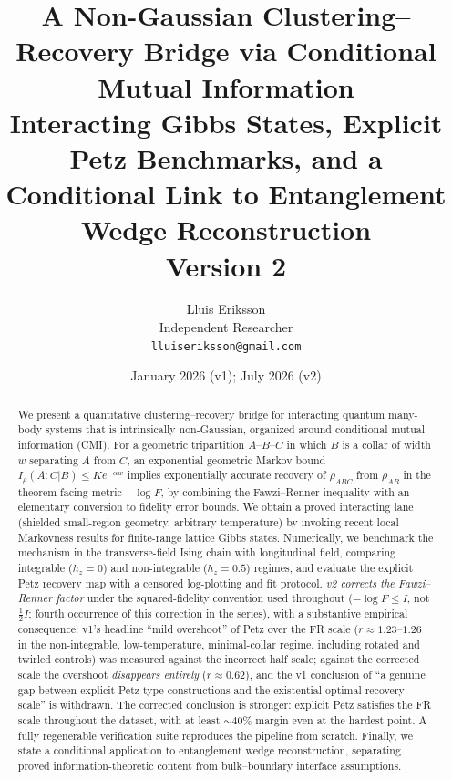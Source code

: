\documentclass[11pt]{article}
\title{A Non-Gaussian Clustering--Recovery Bridge via Conditional Mutual
Information\\
{\large Interacting Gibbs States, Explicit Petz Benchmarks, and a
Conditional Link to Entanglement Wedge Reconstruction}\\
{\normalsize Version 2}}
\author{Lluis Eriksson\\ Independent Researcher\\ \texttt{lluiseriksson@gmail.com}}
\date{January 2026 (v1); July 2026 (v2)}
\theoremstyle{remark}
\begin{document}
\maketitle

\begin{abstract}
We present a quantitative clustering--recovery bridge for interacting
quantum many-body systems that is intrinsically non-Gaussian, organized
around conditional mutual information (CMI). For a geometric tripartition
$A$--$B$--$C$ in which $B$ is a collar of width $w$ separating $A$ from
$C$, an exponential geometric Markov bound $I_\rho(A:C|B) \le Ke^{-\alpha
w}$ implies exponentially accurate recovery of $\rho_{ABC}$ from
$\rho_{AB}$ in the theorem-facing metric $-\log F$, by combining the
Fawzi--Renner inequality with an elementary conversion to fidelity error
bounds. We obtain a proved interacting lane (shielded small-region
geometry, arbitrary temperature) by invoking recent local Markovness
results for finite-range lattice Gibbs states. Numerically, we benchmark
the mechanism in the transverse-field Ising chain with longitudinal field,
comparing integrable ($h_z = 0$) and non-integrable ($h_z = 0.5$) regimes,
and evaluate the explicit Petz recovery map with a censored log-plotting
and fit protocol. \emph{v2 corrects the Fawzi--Renner factor} under the
squared-fidelity convention used throughout ($-\log F \le I$, not
$\tfrac12 I$; fourth occurrence of this correction in the series), with a
substantive empirical consequence: v1's headline ``mild overshoot'' of
Petz over the FR scale ($r \approx 1.23$--$1.26$ in the non-integrable,
low-temperature, minimal-collar regime, including rotated and twirled
controls) was measured against the incorrect half scale; against the
corrected scale the overshoot \emph{disappears entirely} ($r \approx
0.62$), and the v1 conclusion of ``a genuine gap between explicit
Petz-type constructions and the existential optimal-recovery scale'' is
withdrawn. The corrected conclusion is stronger: explicit Petz satisfies
the FR scale throughout the dataset, with at least $\sim 40\%$ margin
even at the hardest point. A fully regenerable verification suite
reproduces the pipeline from scratch. Finally, we state a conditional
application to entanglement wedge reconstruction, separating proved
information-theoretic content from bulk--boundary interface assumptions.
\end{abstract}
\end{document}
